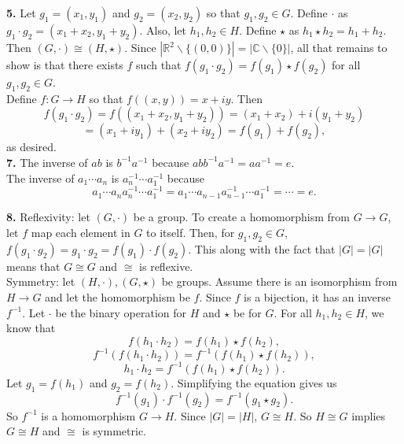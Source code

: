 \documentclass{article}
\newcommand{\R}{\mathbb{R}}
\newcommand{\C}{\mathbb{C}}
\begin{document}
\textbf{5.} Let $g_1 = (x_1, y_1)$ and $g_2 = (x_2, y_2)$ so that $g_1, g_2 \in G$. Define $\cdot$ as $g_1\cdot g_2 = (x_1 + x_2, y_1 + y_2)$. Also, let $h_1, h_2 \in H$. Define $\star$ as $h_1\star h_2 = h_1 + h_2$. Then $(G, \cdot) \cong (H, \star)$. Since $|\R^2\backslash \{(0, 0)\}| = |\C \backslash \{0\}|$, all that remains to show is that there exists $f$ such that $f(g_1\cdot g_2) = f(g_1)\star f(g_2)$ for all $g_1, g_2 \in G$. \\

Define $f: G\to H$ so that $f((x, y)) = x + iy$. Then
$$f(g_1\cdot g_2) = f((x_1 + x_2, y_1 + y_2)) = (x_1 + x_2) + i(y_1 + y_2)$$
$$= (x_1 + iy_1) + (x_2 + iy_2) = f(g_1) + f(g_2),$$
as desired. \\

\textbf{7.} The inverse of $ab$ is $b^{-1}a^{-1}$ because $abb^{-1}a^{-1} = aa^{-1} = e$. \\

The inverse of $a_1\cdots a_n$ is $a_n^{-1}\cdots a_1^{-1}$ because
$$a_1\cdots a_na_n^{-1}\cdots a_1^{-1} = a_1\cdots a_{n - 1}a_{n - 1}^{-1}\cdots a_1^{-1} = \cdots = e.$$

\textbf{8.} Reflexivity: let $(G, \cdot)$ be a group. To create a homomorphism from $G\to G$, let $f$ map each element in $G$ to itself. Then, for $g_1, g_2 \in G$, $f(g_1\cdot g_2) = g_1\cdot g_2 = f(g_1)\cdot f(g_2)$. This along with the fact that $|G| = |G|$ means that $G\cong G$ and $\cong$ is reflexive. \\

Symmetry: let $(H, \cdot), (G, \star)$ be groups. Assume there is an isomorphism from $H\to G$ and let the homomorphism be $f$. Since $f$ is a bijection, it has an inverse $f^{-1}$. Let $\cdot$ be the binary operation for $H$ and $\star$ be for $G$. For all 
$h_1, h_2 \in H$, we know that
$$f(h_1\cdot h_2) = f(h_1)\star f(h_2),$$
$$f^{-1}(f(h_1\cdot h_2)) = f^{-1}(f(h_1)\star f(h_2)),$$
$$h_1\cdot h_2 = f^{-1}(f(h_1)\star f(h_2)).$$
Let $g_1 = f(h_1)$ and $g_2 = f(h_2)$. Simplifying the equation gives us
$$f^{-1}(g_1)\cdot f^{-1}(g_2) = f^{-1}(g_1\star g_2).$$
So $f^{-1}$ is a homomorphism $G\to H$. Since $|G| = |H|$, $G\cong H$. So $H\cong G$ implies $G\cong H$ and $\cong$ is symmetric. \\
\end{document}
